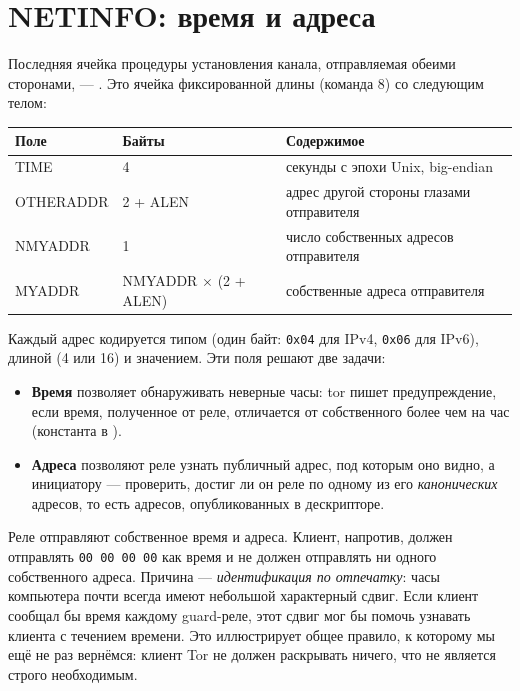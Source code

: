 \section{NETINFO: время и адреса}\label{sec:canale-netinfo}

Последняя ячейка процедуры установления канала, отправляемая обеими сторонами, --- . Это ячейка фиксированной длины (команда 8) со следующим телом:

\begin{center}
\begin{tabularx}{\textwidth}{@{}ll>{\raggedright\arraybackslash}X@{}}
\toprule
Поле & Байты & Содержимое \\
\midrule
TIME & 4 & секунды с эпохи Unix, big-endian \\
OTHERADDR & 2 + ALEN & адрес другой стороны глазами отправителя \\
NMYADDR & 1 & число собственных адресов отправителя \\
MYADDR & NMYADDR $\times$ (2 + ALEN) & собственные адреса отправителя \\
\bottomrule
\end{tabularx}
\end{center}

Каждый адрес кодируется типом (один байт: \texttt{0x04} для IPv4, \texttt{0x06} для IPv6), длиной (4 или 16) и значением. Эти поля решают две задачи:
\begin{itemize}
  \item \textbf{Время} позволяет обнаруживать неверные часы: tor пишет предупреждение, если время, полученное от реле, отличается от собственного более чем на час (константа  в ).
  \item \textbf{Адреса} позволяют реле узнать публичный адрес, под которым оно видно, а инициатору --- проверить, достиг ли он реле по одному из его \emph{канонических} адресов, то есть адресов, опубликованных в дескрипторе.
\end{itemize}

\begin{attenzione}
Реле отправляют собственное время и адреса. Клиент, напротив, должен отправлять \texttt{00 00 00 00} как время и не должен отправлять ни одного собственного адреса. Причина --- \emph{идентификация по отпечатку}: часы компьютера почти всегда имеют небольшой характерный сдвиг. Если клиент сообщал бы время каждому guard-реле, этот сдвиг мог бы помочь узнавать клиента с течением времени. Это иллюстрирует общее правило, к которому мы ещё не раз вернёмся: клиент Tor не должен раскрывать ничего, что не является строго необходимым.
\end{attenzione}

